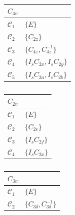     \begin{table}
        \begin{subtable}[t]{0.32\linewidth}
            \centering
            \begin{tabular}[t]{|l|l|}
                \hline
                $C_{4v}$ & \\
                \hline
                $\mathcal{C}_{1}$ & $\{E\}$ \\
                $\mathcal{C}_{2}$ & $\{C_{2 z}\}$ \\
                $\mathcal{C}_{3}$ & $\{C_{4 z}, C_{4 z}^{-1}\}$ \\
                $\mathcal{C}_{4}$ & $\{I_{s} C_{2 x}, I_{s} C_{2 y}\}$ \\
                $\mathcal{C}_{5}$ & $\{I_{s} C_{2 a}, I_{s} C_{2 b}\}$ \\
                \hline
            \end{tabular}
            \caption{}
            \label{table:C4v}
        \end{subtable}
        \begin{subtable}[t]{0.32\linewidth}
            \centering
            \begin{tabular}[t]{|l|l|}
                \hline
                $C_{2v}$ & \\
                \hline
                $\mathcal{C}_{1}$ & $\{E\}$ \\
                $\mathcal{C}_{2}$ & $\{C_{2 e}\}$ \\
                $\mathcal{C}_{3}$ & $\{I_{s} C_{2 f}\}$ \\
                $\mathcal{C}_{4}$ & $\{I_{s} C_{2 x}\}$ \\
                \hline
            \end{tabular}
            \caption{}
            \label{table:C2v}
        \end{subtable}
        \begin{subtable}[t]{0.32\linewidth}
            \centering
            \begin{tabular}[t]{|l|l|}
                \hline
                $C_{3v}$ & \\
                \hline
                $\mathcal{C}_{1}$ & $\{E\}$ \\
                $\mathcal{C}_{2}$ & $\{C_{3 \delta}, C_{3 \delta}^{-1}\}$ \\

\end{tabular}
\end{subtable}
\end{table}
